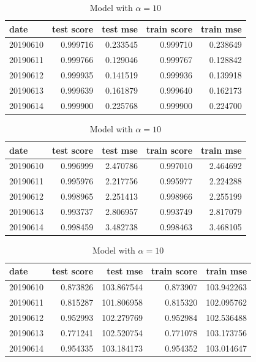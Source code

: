 \documentclass[english, 11pt, a4paper]{article}
\begin{document}
\begin{table}[H]
  \centering
  \begin{minipage}{.6\textwidth}
    \centering
    \begin{tabular}{lrrrr}
    \toprule
    date & test score & test mse & train score & train mse \\
    \midrule
    20190610 & 0.999716 & 0.233545 & 0.999710 & 0.238649 \\
    20190611 & 0.999766 & 0.129046 & 0.999767 & 0.128842 \\
    20190612 & 0.999935 & 0.141519 & 0.999936 & 0.139918 \\
    20190613 & 0.999639 & 0.161879 & 0.999640 & 0.162173 \\
    20190614 & 0.999900 & 0.225768 & 0.999900 & 0.224700 \\
    \bottomrule
    \end{tabular}
    \caption{Model with $\alpha = 0.04$}
  \end{minipage}
  \begin{minipage}{.6\textwidth}
    \centering
    \begin{tabular}{lrrrr}
    \toprule
    date & test score & test mse & train score & train mse \\
    \midrule
    20190610 & 0.996999 & 2.470786 & 0.997010 & 2.464692 \\
    20190611 & 0.995976 & 2.217756 & 0.995977 & 2.224288 \\
    20190612 & 0.998965 & 2.251413 & 0.998966 & 2.255199 \\
    20190613 & 0.993737 & 2.806957 & 0.993749 & 2.817079 \\
    20190614 & 0.998459 & 3.482738 & 0.998463 & 3.468105 \\
    \bottomrule
    \end{tabular}
    \caption{Model with $\alpha = 1$}
  \end{minipage}
  \begin{minipage}{.6\textwidth}
    \centering
    \begin{tabular}{lrrrr}
    \toprule
    date & test score & test mse & train score & train mse \\
    \midrule
    20190610 & 0.873826 & 103.867544 & 0.873907 & 103.942263 \\
    20190611 & 0.815287 & 101.806958 & 0.815320 & 102.095762 \\
    20190612 & 0.952993 & 102.279769 & 0.952984 & 102.536488 \\
    20190613 & 0.771241 & 102.520754 & 0.771078 & 103.173756 \\
    20190614 & 0.954335 & 103.184173 & 0.954352 & 103.014647 \\
    \bottomrule
    \end{tabular}
    \caption{Model with $\alpha = 10$}
  \end{minipage}
\end{table}
\end{document}
